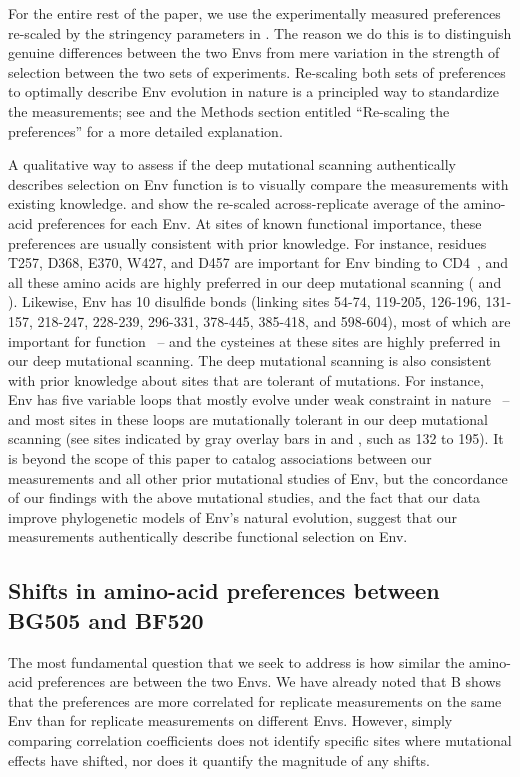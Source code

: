 \documentclass[9pt]{elife}
\begin{document}
For the entire rest of the paper, we use the experimentally measured preferences re-scaled by the stringency parameters in .
The reason we do this is to distinguish genuine differences between the two Envs from mere variation in the strength of selection between the two sets of experiments.
Re-scaling both sets of preferences to optimally describe Env evolution in nature is a principled way to standardize the measurements; see \citet{hilton2017phydms} and the Methods section entitled ``Re-scaling the preferences'' for a more detailed explanation.

A qualitative way to assess if the deep mutational scanning authentically describes selection on Env function is to visually compare the measurements with existing knowledge.
 and  show the re-scaled across-replicate average of the amino-acid preferences for each Env.
At sites of known functional importance, these preferences are usually consistent with prior knowledge.
For instance, residues T257, D368, E370, W427, and D457 are important for Env binding to CD4~\citep{olshevsky1990identification}, and all these amino acids are highly preferred in our deep mutational scanning ( and ).
Likewise, Env has 10 disulfide bonds (linking sites 54-74, 119-205, 126-196, 131-157, 218-247, 228-239, 296-331, 378-445, 385-418, and 598-604), most of which are important for function~\citep{van2008only} -- and the cysteines at these sites are highly preferred in our deep mutational scanning.
The deep mutational scanning is also consistent with prior knowledge about sites that are tolerant of mutations.
For instance, Env has five variable loops that mostly evolve under weak constraint in nature~\citep{starcich1986identification,zolla2010structure} -- and most sites in these loops are mutationally tolerant in our deep mutational scanning (see sites indicated by gray overlay bars in  and , such as 132 to 195).
It is beyond the scope of this paper to catalog associations between our measurements and all other prior mutational studies of Env, but the concordance of our findings with the above mutational studies, and the fact that our data improve phylogenetic models of Env's natural evolution, suggest that our measurements authentically describe functional selection on Env.

\subsection{Shifts in amino-acid preferences between BG505 and BF520}
The most fundamental question that we seek to address is how similar the amino-acid preferences are between the two Envs.
We have already noted that B shows that the preferences are more correlated for replicate measurements on the same Env than for replicate measurements on different Envs.
However, simply comparing correlation coefficients does not identify specific sites where mutational effects have shifted, nor does it quantify the magnitude of any shifts.
\end{document}
